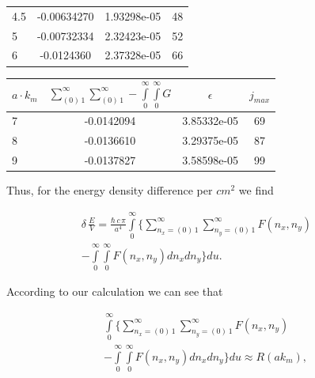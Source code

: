 \documentclass[twoside, 10pt, ptm]{article}
\begin{document}
\begin{multicols}{2}
\begin{center}
\begin{tabular}{ | l | c | c | c | }
4.5 & -0.00634270 & 1.93298e-05 & 48 \\
5 & -0.00732334 & 2.32423e-05 & 52 \\

6 & -0.0124360 & 2.37328e-05 & 66 \\


\hline
\end{tabular}


\begin{tabular}{ | l | c | c | c | }
\hline
$a \cdot k_m$ & $\sum\limits_{\left(0\right)\,1}^{\infty}\sum\limits_{\left(0\right)\,1}^{\infty}-\int\limits_{0}^{\infty}\int\limits_{0}^{\infty}G$ & $\epsilon$ & $j_{max}$ \\
\hline


7 & -0.0142094 & 3.85332e-05 & 69 \\
8 & -0.0136610 & 3.29375e-05 & 87 \\
9 & -0.0137827 & 3.58598e-05 & 99 \\
\hline
\end{tabular}
\end{center}

    Thus, for the energy density difference per \(cm^2\) we find

\begin{equation}
\begin{array}{r}
    \delta\,\frac{E}{V} = \frac{\hbar\,c\,\pi}{a^4} \int\limits_{0}^{\infty} \Bigg\{ \sum\limits_{n_x=\left(0\right)\,1}^{\infty} \sum\limits_{n_y=\left(0\right)\,1}^{\infty} F\left(n_x, n_y\right) \,\,\,\,\,\,\,\,\,\,\\ 
- \int\limits_{0}^{\infty} \int\limits_{0}^{\infty} F\left(n_x, n_y\right) d{n_x} d{n_y} \Bigg\} d{u}.
\end{array}
\end{equation}


    According to our calculation we can see that

\begin{equation}
\begin{array}{l}
    \int\limits_{0}^{\infty} \Bigg\{ \sum\limits_{n_x=\left(0\right)\,1}^{\infty} \sum\limits_{n_y=\left(0\right)\,1}^{\infty} F\left(n_x, n_y\right) \\
- \int\limits_{0}^{\infty} \int\limits_{0}^{\infty} F\left(n_x, n_y\right) d{n_x} d{n_y} \Bigg\} d{u} \approx R\left(a k_m\right),
\end{array}
\end{equation}


\end{multicols}
\end{document}
